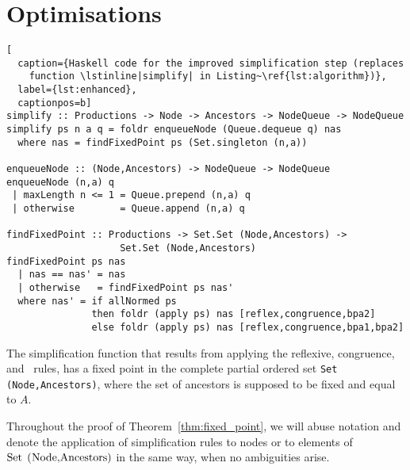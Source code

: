 \section{Optimisations}
\label{sec:optimisations}

\begin{lstlisting}[
  caption={Haskell code for the improved simplification step (replaces
    function \lstinline|simplify| in Listing~\ref{lst:algorithm})},
  label={lst:enhanced},
  captionpos=b]
simplify :: Productions -> Node -> Ancestors -> NodeQueue -> NodeQueue
simplify ps n a q = foldr enqueueNode (Queue.dequeue q) nas
  where nas = findFixedPoint ps (Set.singleton (n,a))

enqueueNode :: (Node,Ancestors) -> NodeQueue -> NodeQueue
enqueueNode (n,a) q
 | maxLength n <= 1 = Queue.prepend (n,a) q
 | otherwise        = Queue.append (n,a) q

findFixedPoint :: Productions -> Set.Set (Node,Ancestors) -> 
                    Set.Set (Node,Ancestors)
findFixedPoint ps nas
  | nas == nas' = nas
  | otherwise   = findFixedPoint ps nas'
  where nas' = if allNormed ps
               then foldr (apply ps) nas [reflex,congruence,bpa2]
               else foldr (apply ps) nas [reflex,congruence,bpa1,bpa2]
\end{lstlisting}

\begin{theorem}
\label{thm:fixed_point}
	The simplification function that results from applying the reflexive,
	congruence, and \BPA\ rules, has a fixed point in the complete partial
	ordered set \lstinline{Set (Node,Ancestors)}, where the set of ancestors
	is supposed to be fixed and equal to $A$.
\end{theorem}

Throughout the proof of Theorem~\ref{thm:fixed_point}, we will abuse 
notation and denote the application of simplification rules
to nodes or to elements of $\text{\lstinline{Set (Node,Ancestors)}}$
in the same way, when no ambiguities arise.

